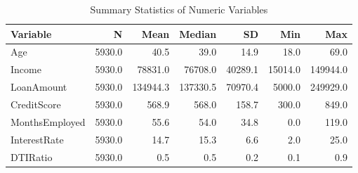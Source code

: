 \begin{table}[H]\centering
\caption{Summary Statistics of Numeric Variables}
\label{Table 2:summary_stats}
\begin{tabular}{lrrrrrr}
\toprule
Variable & N & Mean & Median & SD & Min & Max \\
\midrule
Age & 5930.0 & 40.5 & 39.0 & 14.9 & 18.0 & 69.0 \\
Income & 5930.0 & 78831.0 & 76708.0 & 40289.1 & 15014.0 & 149944.0 \\
LoanAmount & 5930.0 & 134944.3 & 137330.5 & 70970.4 & 5000.0 & 249929.0 \\
CreditScore & 5930.0 & 568.9 & 568.0 & 158.7 & 300.0 & 849.0 \\
MonthsEmployed & 5930.0 & 55.6 & 54.0 & 34.8 & 0.0 & 119.0 \\
InterestRate & 5930.0 & 14.7 & 15.3 & 6.6 & 2.0 & 25.0 \\
DTIRatio & 5930.0 & 0.5 & 0.5 & 0.2 & 0.1 & 0.9 \\
\bottomrule
\end{tabular}
\end{table}
